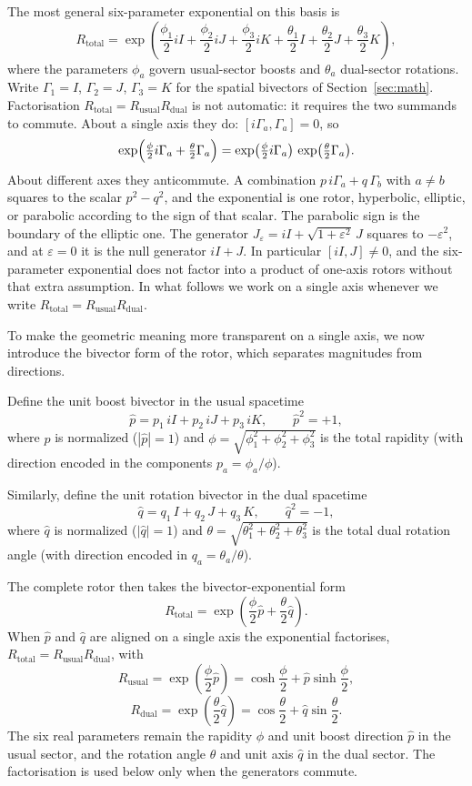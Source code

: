 \documentclass[a4paper]{article}
\begin{document}
The most general six-parameter exponential on this basis is
\[
R_\text{total} = \exp\left( \frac{\phi_1}{2} iI + \frac{\phi_2}{2} iJ + \frac{\phi_3}{2} iK + \frac{\theta_1}{2} I + \frac{\theta_2}{2} J + \frac{\theta_3}{2} K \right),
\]
where the parameters $\phi_a$ govern usual-sector boosts and $\theta_a$ dual-sector rotations. Write $\Gamma_1=I$, $\Gamma_2=J$, $\Gamma_3=K$ for the spatial bivectors of Section~\ref{sec:math}. Factorisation $R_{\mathrm{total}}=R_{\mathrm{usual}}R_{\mathrm{dual}}$ is not automatic: it requires the two summands to commute. About a single axis they do: $[i\Gamma_a,\Gamma_a]=0$, so
\[
\exp\Bigl(\tfrac{\phi}{2}i\Gamma_a+\tfrac{\theta}{2}\Gamma_a\Bigr)
=\exp\bigl(\tfrac{\phi}{2}i\Gamma_a\bigr)\,\exp\bigl(\tfrac{\theta}{2}\Gamma_a\bigr).
\]
About different axes they anticommute. A combination $p\,i\Gamma_a+q\,\Gamma_b$ with $a\neq b$ squares to the scalar $p^2-q^2$, and the exponential is one rotor, hyperbolic, elliptic, or parabolic according to the sign of that scalar. The parabolic sign is the boundary of the elliptic one. The generator $J_\varepsilon=iI+\sqrt{1+\varepsilon^2}\,J$ squares to $-\varepsilon^2$, and at $\varepsilon=0$ it is the null generator $iI+J$. In particular $[iI,J]\neq 0$, and the six-parameter exponential does not factor into a product of one-axis rotors without that extra assumption. In what follows we work on a single axis whenever we write $R_{\mathrm{total}}=R_{\mathrm{usual}}R_{\mathrm{dual}}$.

To make the geometric meaning more transparent on a single axis, we now introduce the bivector form of the rotor, which separates magnitudes from directions.

Define the unit boost bivector in the usual spacetime
\[
\hat{p} = p_1 \, iI + p_2 \, iJ + p_3 \, iK, \qquad \hat{p}^2 = +1,
\]
where $\hat{p}$ is normalized ($|\hat{p}| = 1$) and $\phi = \sqrt{\phi_1^2 + \phi_2^2 + \phi_3^2}$ is the total rapidity (with direction encoded in the components $p_a = \phi_a / \phi$).

Similarly, define the unit rotation bivector in the dual spacetime
\[
\hat{q} = q_1 \, I + q_2 \, J + q_3 \, K, \qquad \hat{q}^2 = -1,
\]
where $\hat{q}$ is normalized ($|\hat{q}| = 1$) and $\theta = \sqrt{\theta_1^2 + \theta_2^2 + \theta_3^2}$ is the total dual rotation angle (with direction encoded in $q_a = \theta_a / \theta$).

The complete rotor then takes the bivector-exponential form
\[
R_\text{total} = \exp\!\left( \frac{\phi}{2} \hat{p} + \frac{\theta}{2} \hat{q} \right).
\]
When $\hat{p}$ and $\hat{q}$ are aligned on a single axis the exponential factorises, $R_{\mathrm{total}}=R_{\mathrm{usual}}R_{\mathrm{dual}}$, with
\[
R_\text{usual} = \exp\!\left( \frac{\phi}{2} \hat{p} \right)
= \cosh\frac{\phi}{2} + \hat{p} \sinh\frac{\phi}{2},
\]
\[
R_\text{dual} = \exp\!\left( \frac{\theta}{2} \hat{q} \right)
= \cos\frac{\theta}{2} + \hat{q} \sin\frac{\theta}{2}.
\]
The six real parameters remain the rapidity $\phi$ and unit boost direction $\hat{p}$ in the usual sector, and the rotation angle $\theta$ and unit axis $\hat{q}$ in the dual sector. The factorisation is used below only when the generators commute.
\end{document}
